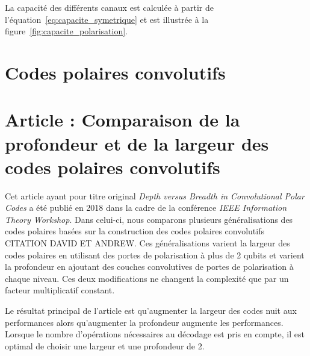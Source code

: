 La capacité des différents canaux est calculée à partir 
de l'équation~\eqref{eq:capacite_symetrique}
et est illustrée à la figure~\ref{fig:capacite_polarisation}.












\section{Codes polaires convolutifs}
\label{sec:codes_polaires_conv}

\section{Article : Comparaison de la profondeur et de la largeur des codes polaires convolutifs}

Cet article ayant pour titre original \textit{Depth versus Breadth in Convolutional Polar Codes}
a été publié en 2018 dans la cadre de la conférence \textit{IEEE Information Theory Workshop}.
Dans celui-ci,
nous comparons plusieurs généralisations des codes polaires basées sur la construction 
des codes polaires convolutifs CITATION DAVID ET ANDREW.
Ces généralisations varient la largeur des codes polaires en utilisant des portes 
de polarisation à plus de 2 qubits 
et varient la profondeur en ajoutant des couches convolutives 
de portes de polarisation à chaque niveau.
Ces deux modifications ne changent la complexité que par un facteur multiplicatif constant.

Le résultat principal de l'article est qu'augmenter la largeur des codes 
nuit aux performances alors qu'augmenter la profondeur augmente les performances.
Lorsque le nombre d'opérations nécessaires au décodage est pris en compte,
il est optimal de choisir une largeur et une profondeur de 2.




